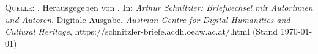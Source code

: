 \bigskip
\printindex[pw]
\vspace{3cm}

\vfill

\footnotesize
\textsc{Quelle}: \titel. Herausgegeben von {\editorInnen}. In: \emph{Arthur Schnitzler: Briefwechsel mit Autorinnen und Autoren}. Digitale Ausgabe. \emph{Austrian Centre for Digital Humanities and Cultural Heritage}, https://schnitzler-briefe.acdh.oeaw.ac.at/{\dateiname}.html (Stand \today)


